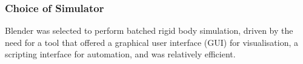 \documentclass[preprint,12pt]{elsarticle}
\begin{document}
\subsubsection{Choice of Simulator}
Blender was selected to perform batched rigid body simulation, driven by the need for a tool that offered a graphical user interface (GUI) for visualisation, a scripting interface for automation, and was relatively efficient.
\end{document}
